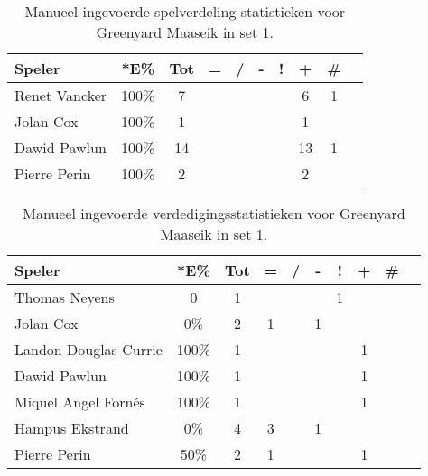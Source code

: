 \begin{table}[ht!]
    \centering
    \scriptsize
    \begin{tabular}{|l|c|c|c|c|c|c|c|c|c|} \hline
        \textbf{Speler}& *E\% & Tot & = & / & - & ! & + & \# \\ \hline
        Renet Vancker  & 100\% & 7 &  &  &  &  & 6 & 1  \\
        Jolan Cox  & 100\% & 1 &  &  &  &  & 1 &  \\ 
        Dawid Pawlun  & 100\% & 14 &  &  &  &  & 13 & 1  \\ 
        Pierre Perin & 100\% & 2 &  &  &  &  & 2 & \\ \hline
    \end{tabular}
    \caption[Manueel ingevoerde spelverdelingsstatistieken voor Greenyard Maaseik in set 1]{\label{tab:PL1SetMaaseikMan1}Manueel ingevoerde spelverdeling statistieken voor Greenyard Maaseik in set 1.}
\end{table}

\begin{table}[ht!]
    \centering
    \scriptsize
    \begin{tabular}{|l|c|c|c|c|c|c|c|c|c|} \hline
        \textbf{Speler}  & *E\% & Tot & = & / & - & ! & + & \# \\ \hline
        Thomas Neyens & 0 & 1 & & & & 1 & & \\
        Jolan Cox & 0\% & 2 & 1 &  & 1 &  &  &  \\ 
        Landon Douglas Currie & 100\% & 1 &  &  &  &  & 1 &  \\ 
        Dawid Pawlun & 100\% & 1 &  &  &  &  & 1 &  \\ 
        Miquel Angel Fornés & 100\% & 1 &  &  &  &  & 1 &  \\ 
        Hampus Ekstrand & 0\% & 4 & 3 &  & 1 &  &  &  \\ 
        Pierre Perin & 50\% & 2 & 1 &  &  &  & 1 &  \\ \hline
    \end{tabular}
    \caption[Manueel ingevoerde verdedigingsstatistieken voor Greenyard Maaseik in set 1]{\label{tab:PL1DigMaaseikMan1}Manueel ingevoerde verdedigingsstatistieken voor Greenyard Maaseik in set 1.}
\end{table}

